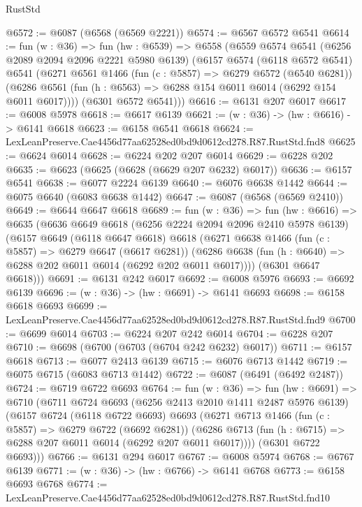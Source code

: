 \begin{lexlean}{RustStd}
\begin{coremodule}
{{@6572 := @6087 (@6568 (@6569 @2221))
@6574 := @6567 @6572 @6541
@6614 := fun (w : @36) =>
  fun (hw : @6539) =>
  @6558
    (@6559
      @6574
      @6541
      (@6256 @2089 @2094 @2096 @2221 @5980 @6139)
      (@6157
        @6574
        (@6118 @6572 @6541)
        @6541
        (@6271
          @6561
          @1466
          (fun (c : @5857) => @6279 @6572 (@6540 @6281))
          (@6286 @6561 (fun (h : @6563) => @6288 @154 @6011 @6014 (@6292 @154 @6011 @6017))))
        (@6301 @6572 @6541)))
@6616 := @6131 @207 @6017
@6617 := @6008 @5978
@6618 := @6617 @6139
@6621 := (w : @36) -> (hw : @6616) -> @6141 @6618
@6623 := @6158 @6541 @6618
@6624 := LexLeanPreserve.Cae4456d77aa62528ed0bd9d0612cd278.R87.RustStd.fnd8
@6625 := @6624 @6014
@6628 := @6224 @202 @207 @6014
@6629 := @6228 @202
@6635 := @6623 (@6625 (@6628 (@6629 @207 @6232) @6017))
@6636 := @6157 @6541
@6638 := @6077 @2224 @6139
@6640 := @6076 @6638 @1442
@6644 := @6075 @6640 (@6083 @6638 @1442)
@6647 := @6087 (@6568 (@6569 @2410))
@6649 := @6644 @6647 @6618
@6689 := fun (w : @36) =>
  fun (hw : @6616) =>
  @6635
    (@6636
      @6649
      @6618
      (@6256 @2224 @2094 @2096 @2410 @5978 @6139)
      (@6157
        @6649
        (@6118 @6647 @6618)
        @6618
        (@6271
          @6638
          @1466
          (fun (c : @5857) => @6279 @6647 (@6617 @6281))
          (@6286 @6638 (fun (h : @6640) => @6288 @202 @6011 @6014 (@6292 @202 @6011 @6017))))
        (@6301 @6647 @6618)))
@6691 := @6131 @242 @6017
@6692 := @6008 @5976
@6693 := @6692 @6139
@6696 := (w : @36) -> (hw : @6691) -> @6141 @6693
@6698 := @6158 @6618 @6693
@6699 := LexLeanPreserve.Cae4456d77aa62528ed0bd9d0612cd278.R87.RustStd.fnd9
@6700 := @6699 @6014
@6703 := @6224 @207 @242 @6014
@6704 := @6228 @207
@6710 := @6698 (@6700 (@6703 (@6704 @242 @6232) @6017))
@6711 := @6157 @6618
@6713 := @6077 @2413 @6139
@6715 := @6076 @6713 @1442
@6719 := @6075 @6715 (@6083 @6713 @1442)
@6722 := @6087 (@6491 (@6492 @2487))
@6724 := @6719 @6722 @6693
@6764 := fun (w : @36) =>
  fun (hw : @6691) =>
  @6710
    (@6711
      @6724
      @6693
      (@6256 @2413 @2010 @1411 @2487 @5976 @6139)
      (@6157
        @6724
        (@6118 @6722 @6693)
        @6693
        (@6271
          @6713
          @1466
          (fun (c : @5857) => @6279 @6722 (@6692 @6281))
          (@6286 @6713 (fun (h : @6715) => @6288 @207 @6011 @6014 (@6292 @207 @6011 @6017))))
        (@6301 @6722 @6693)))
@6766 := @6131 @294 @6017
@6767 := @6008 @5974
@6768 := @6767 @6139
@6771 := (w : @36) -> (hw : @6766) -> @6141 @6768
@6773 := @6158 @6693 @6768
@6774 := LexLeanPreserve.Cae4456d77aa62528ed0bd9d0612cd278.R87.RustStd.fnd10
}}
\end{coremodule}
\end{lexlean}
